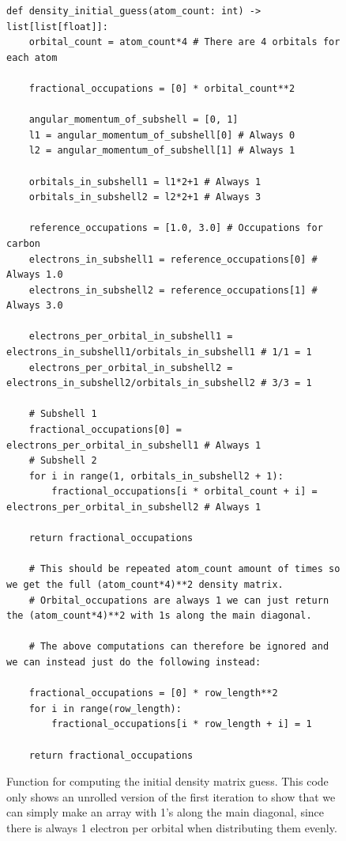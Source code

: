 \begin{figure}[H]
\begin{verbatim}
def density_initial_guess(atom_count: int) -> list[list[float]]:
    orbital_count = atom_count*4 # There are 4 orbitals for each atom

    fractional_occupations = [0] * orbital_count**2

    angular_momentum_of_subshell = [0, 1]
    l1 = angular_momentum_of_subshell[0] # Always 0
    l2 = angular_momentum_of_subshell[1] # Always 1

    orbitals_in_subshell1 = l1*2+1 # Always 1
    orbitals_in_subshell2 = l2*2+1 # Always 3

    reference_occupations = [1.0, 3.0] # Occupations for carbon
    electrons_in_subshell1 = reference_occupations[0] # Always 1.0
    electrons_in_subshell2 = reference_occupations[1] # Always 3.0

    electrons_per_orbital_in_subshell1 = electrons_in_subshell1/orbitals_in_subshell1 # 1/1 = 1
    electrons_per_orbital_in_subshell2 = electrons_in_subshell2/orbitals_in_subshell2 # 3/3 = 1

    # Subshell 1
    fractional_occupations[0] = electrons_per_orbital_in_subshell1 # Always 1
    # Subshell 2
    for i in range(1, orbitals_in_subshell2 + 1):
        fractional_occupations[i * orbital_count + i] = electrons_per_orbital_in_subshell2 # Always 1

    return fractional_occupations

    # This should be repeated atom_count amount of times so we get the full (atom_count*4)**2 density matrix.
    # Orbital_occupations are always 1 we can just return the (atom_count*4)**2 with 1s along the main diagonal.

    # The above computations can therefore be ignored and we can instead just do the following instead:
    
    fractional_occupations = [0] * row_length**2
    for i in range(row_length):
        fractional_occupations[i * row_length + i] = 1

    return fractional_occupations
\end{verbatim}
\caption{Function for computing the initial density matrix guess. This code only shows an unrolled version of the first iteration to show that we can simply make an array with 1's along the main diagonal, since there is always 1 electron per orbital when distributing them evenly.}
\end{figure}


